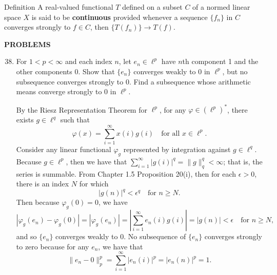 \begin{namedthm*}{Definition}
    A real-valued functional $T$ defined on a subset $C$ of a normed linear space $X$ is said to be \textbf{continuous} provided whenever a sequence $\{f_n\}$ in $C$ converges strongly to $f\in C$, then $\{T(f_n)\}\to T(f)$.    
\end{namedthm*}

\begin{center}
	\textbf{PROBLEMS}
\end{center}
\begin{enumerate}
	\setcounter{enumi}{37}
    \item For $1<p<\infty$ and each index $n$, let $e_n\in\ell^p$ have $n$th component 1 and the other components 0.
    Show that $\{e_n\}$ converges weakly to 0 in $\ell^p$, but no subsequence converges strongly to 0.
    Find a subsequence whose arithmetic means converge strongly to 0 in $\ell^p$.

    By the Riesz Representation Theorem for $\ell^p$, for any $\varphi\in(\ell^p)^*$, there exists $g\in\ell^q$ such that 
    \[
        \varphi(x)=\sum_{i=1}^\infty x(i)g(i)\quad\text{for all }x\in\ell^p.
    \]
    Consider any linear functional $\varphi_g$ represented by integration against $g\in\ell^q$.
    Because $g\in\ell^p$, then we have that $\sum_{i=1}^\infty|g(i)|^q=\|g\|_q^q<\infty$; that is, the series is summable.
    From Chapter 1.5 Proposition 20(i), then for each $\epsilon>0$, there is an index $N$ for which 
    \[
        |g(n)|^q<\epsilon^q\quad\text{for }n\ge N.
    \]
    Then because $\varphi_g(0)=0$, we have
    \[
        |\varphi_g(e_n)-\varphi_g(0)|=|\varphi_g(e_n)|=\left|\sum_{i=1}^\infty e_n(i)g(i)\right|=|g(n)|<\epsilon\quad\text{for }n\ge N,
    \]
    and so $\{e_n\}$ converges weakly to $0$.
    No subsequence of $\{e_n\}$ converges strongly to zero because for any $e_n$, we have that 
    \[
        \|e_n-0\|_p^p=\sum_{i=1}^\infty |e_n(i)|^p=|e_n(n)|^p=1.
    \]

\end{enumerate}